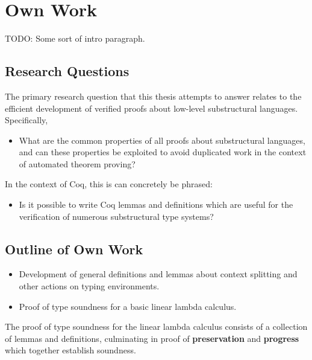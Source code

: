 \documentclass[]{unswthesis}
\begin{document}
\chapter{Own Work}

TODO: Some sort of intro paragraph.

\section{Research Questions}

The primary research question that this thesis attempts to answer relates to the efficient development of verified proofs about low-level substructural languages. Specifically,

\begin{itemize}
\item What are the common properties of all proofs about substructural languages, and can these properties be exploited to avoid duplicated work in the context of automated theorem proving?
\end{itemize}

In the context of Coq, this is can concretely be phrased:

\begin{itemize}
\item Is it possible to write Coq lemmas and definitions which are useful for the verification of numerous substructural type systems?
\end{itemize}



\section{Outline of Own Work}

\begin{itemize}
\item Development of general definitions and lemmas about context splitting and other actions on typing environments.
\item Proof of type soundness for a basic linear lambda calculus.
\end{itemize}

The proof of type soundness for the linear lambda calculus consists of a collection of lemmas and definitions, culminating in proof of \textbf{preservation} and \textbf{progress} which together establish soundness.
\end{document}
